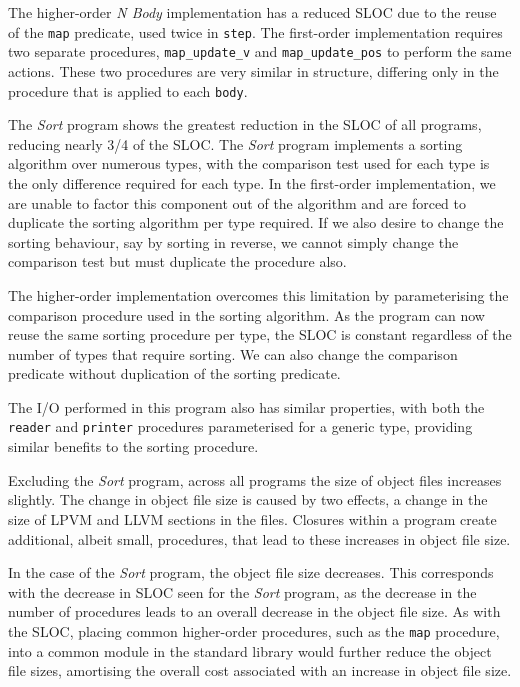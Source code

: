 The higher-order \textit{N Body} implementation has a reduced SLOC due to the reuse of the \texttt{map} predicate, used twice in \texttt{step}. The first-order implementation requires two separate procedures, \texttt{map\_update\_v} and \texttt{map\_update\_pos} to perform the same actions. These two procedures are very similar in structure, differing only in the procedure that is applied to each \texttt{body}. 

The \textit{Sort} program shows the greatest reduction in the SLOC of all programs, reducing nearly 3/4 of the SLOC. The \textit{Sort} program implements a sorting algorithm over numerous types, with the comparison test used for each type is the only difference required for each type. In the first-order implementation, we are unable to factor this component out of the algorithm and are forced to duplicate the sorting algorithm per type required. If we also desire to change the sorting behaviour, say by sorting in reverse, we cannot simply change the comparison test but must duplicate the procedure also. 

The higher-order implementation overcomes this limitation by parameterising the comparison procedure used in the sorting algorithm. As the program can now reuse the same sorting procedure per type, the SLOC is constant regardless of the number of types that require sorting. We can also change the comparison predicate without duplication of the sorting predicate.

The I/O performed in this program also has similar properties, with both the \texttt{reader} and \texttt{printer} procedures parameterised for a generic type, providing similar benefits to the sorting procedure. 

Excluding the \textit{Sort} program, across all programs the size of object files increases slightly. The change in object file size is caused by two effects, a change in the size of LPVM and LLVM sections in the files. Closures within a program create additional, albeit small, procedures, that lead to these increases in object file size. 

In the case of the \textit{Sort} program, the object file size decreases. This corresponds with the decrease in SLOC seen for the \textit{Sort} program, as the decrease in the number of procedures leads to an overall decrease in the object file size. As with the SLOC, placing common higher-order procedures, such as the \texttt{map} procedure, into a common module in the standard library would further reduce the object file sizes, amortising the overall cost associated with an increase in object file size.

